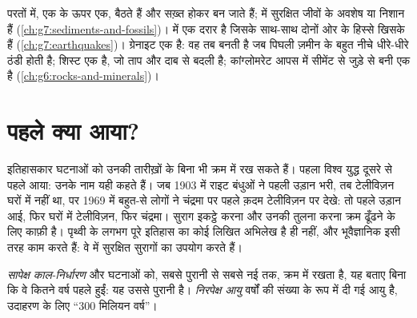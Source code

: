 \begin{recall}
 परतों में, एक के ऊपर एक, बैठते हैं और सख़्त होकर  बन जाते हैं;
  में सुरक्षित जीवों के अवशेष या निशान हैं
(\cref{ch:g7:sediments-and-fossils})। \emph{}  में एक दरार है जिसके
साथ-साथ दोनों ओर के हिस्से खिसके हैं (\cref{ch:g7:earthquakes})। ग्रेनाइट एक
\emph{} है: वह तब बनती है जब पिघली  ज़मीन के बहुत नीचे धीरे-धीरे
ठंडी होती है; शिस्ट एक \emph{} है, जो ताप और दाब से बदली है;
कांग्लोमरेट आपस में सीमेंट से जुड़े  से बनी एक  है
(\cref{ch:g6:rocks-and-minerals})।
\end{recall}

\section{पहले क्या आया?}

इतिहासकार घटनाओं को उनकी तारीख़ों के बिना भी क्रम में रख सकते हैं। पहला विश्व युद्ध
दूसरे से पहले आया: उनके नाम यही कहते हैं। जब 1903 में राइट बंधुओं ने पहली उड़ान
भरी, तब टेलीविज़न घरों में नहीं था, पर 1969 में बहुत-से लोगों ने चंद्रमा पर पहले क़दम
टेलीविज़न पर देखे: तो पहले उड़ान आई, फिर घरों में टेलीविज़न, फिर चंद्रमा। सुराग
इकट्ठे करना और उनकी तुलना करना क्रम ढूँढने के लिए काफ़ी है। पृथ्वी के लगभग पूरे
इतिहास का कोई लिखित अभिलेख है ही नहीं, और भूवैज्ञानिक इसी तरह काम करते हैं: वे
 में सुरक्षित सुरागों का उपयोग करते
हैं।

\begin{definition}[सापेक्ष काल-निर्धारण और निरपेक्ष आयु]\label{def:g7:geological-time:relative-dating}
\emph{सापेक्ष काल-निर्धारण}  और घटनाओं को,
सबसे पुरानी से सबसे नई तक, क्रम में रखता है, यह बताए बिना कि वे कितने वर्ष पहले
हुईं: यह  उससे पुरानी है। \emph{निरपेक्ष आयु} वर्षों
की संख्या के रूप में दी गई आयु है, उदाहरण के लिए
``\num{300} मिलियन वर्ष''।
\end{definition}

